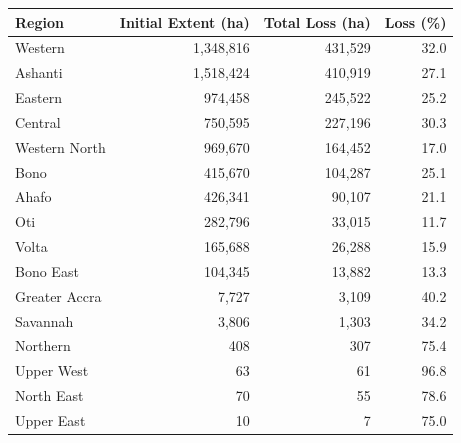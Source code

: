 \begin{tabular}{lrrr}
\toprule
Region & Initial Extent (ha) & Total Loss (ha) & Loss (\%) \\
\midrule
Western & 1,348,816 & 431,529 & 32.0 \\
Ashanti & 1,518,424 & 410,919 & 27.1 \\
Eastern & 974,458 & 245,522 & 25.2 \\
Central & 750,595 & 227,196 & 30.3 \\
Western North & 969,670 & 164,452 & 17.0 \\
Bono & 415,670 & 104,287 & 25.1 \\
Ahafo & 426,341 & 90,107 & 21.1 \\
Oti & 282,796 & 33,015 & 11.7 \\
Volta & 165,688 & 26,288 & 15.9 \\
Bono East & 104,345 & 13,882 & 13.3 \\
Greater Accra & 7,727 & 3,109 & 40.2 \\
Savannah & 3,806 & 1,303 & 34.2 \\
Northern & 408 & 307 & 75.4 \\
Upper West & 63 & 61 & 96.8 \\
North East & 70 & 55 & 78.6 \\
Upper East & 10 & 7 & 75.0 \\
\bottomrule
\end{tabular}
